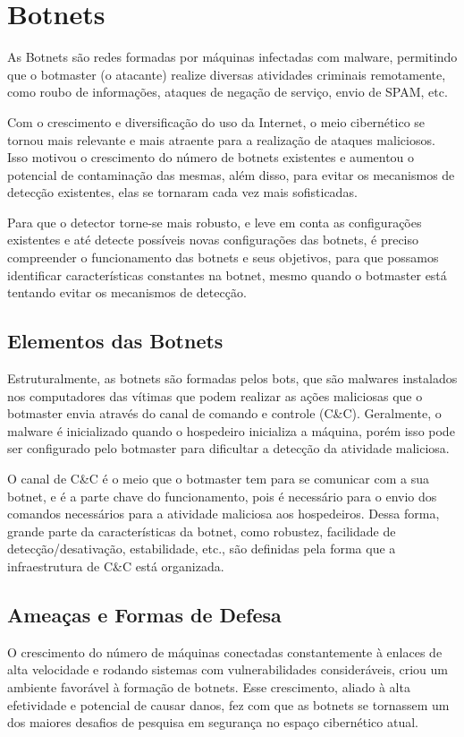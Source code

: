 \chapter{Botnets}
As Botnets são redes formadas por máquinas infectadas com malware, permitindo que o botmaster (o atacante) realize diversas atividades criminais remotamente, como roubo de informações, ataques de negação de serviço, envio de SPAM, etc.\cite{silva2013botnets}

Com o crescimento e diversificação do uso da Internet, o meio cibernético se tornou mais relevante e mais atraente para a realização de ataques maliciosos. Isso motivou o crescimento do número de botnets existentes e aumentou o potencial de contaminação das mesmas, além disso, para evitar os mecanismos de detecção existentes, elas se tornaram cada vez mais sofisticadas.

Para que o detector torne-se mais robusto, e leve em conta as configurações existentes e até detecte possíveis novas configurações das botnets, é preciso compreender o funcionamento das botnets e seus objetivos, para que possamos identificar características constantes na botnet, mesmo quando o botmaster está tentando evitar os mecanismos de detecção.

\section{Elementos das Botnets}
Estruturalmente, as botnets são formadas pelos bots, que são malwares instalados nos computadores das vítimas que podem realizar as ações maliciosas que o botmaster envia através do canal de comando e controle (C\&C). Geralmente, o malware é inicializado quando o hospedeiro inicializa a máquina, porém isso pode ser configurado pelo botmaster para dificultar a detecção da atividade maliciosa.

O canal de C\&C é o meio que o botmaster tem para se comunicar com a sua botnet, e é a parte chave do funcionamento, pois é necessário para o envio dos comandos necessários para a atividade maliciosa aos hospedeiros. Dessa forma, grande parte da características da botnet, como robustez, facilidade de detecção/desativação, estabilidade, etc., são definidas pela forma que a infraestrutura de C\&C está organizada.

\section{Ameaças e Formas de Defesa}
O crescimento do número de máquinas conectadas constantemente à enlaces de alta velocidade e rodando sistemas com vulnerabilidades consideráveis, criou um ambiente favorável à formação de botnets. Esse crescimento, aliado à alta efetividade e potencial de causar danos, fez com que as botnets se tornassem um dos maiores desafios de pesquisa em segurança no espaço cibernético atual. \cite{soltani2014survey}

